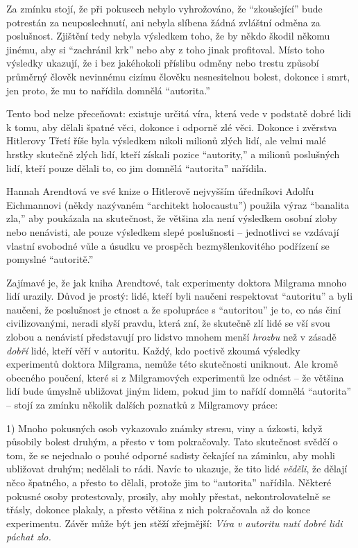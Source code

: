 \documentclass{book}
\begin{document}
Za zmínku stojí, že při pokusech nebylo vyhrožováno, že \enquote{zkoušející} bude potrestán za neuposlechnutí, ani nebyla slíbena žádná zvláštní odměna za poslušnost. Zjištění tedy nebyla výsledkem toho, že by někdo škodil někomu jinému, aby si \enquote{zachránil krk} nebo aby z toho jinak profitoval. Místo toho výsledky ukazují, že i bez jakéhokoli příslibu odměny nebo trestu způsobí průměrný člověk nevinnému cizímu člověku nesnesitelnou bolest, dokonce i smrt, jen proto, že mu to nařídila domnělá \enquote{autorita.}

Tento bod nelze přeceňovat: existuje určitá víra, která vede v podstatě dobré lidi k tomu, aby dělali špatné věci, dokonce i odporně zlé věci. Dokonce i zvěrstva Hitlerovy Třetí říše byla výsledkem nikoli milionů zlých lidí, ale velmi malé hrstky skutečně zlých lidí, kteří získali pozice \enquote{autority,} a milionů poslušných lidí, kteří pouze dělali to, co jim domnělá \enquote{autorita} nařídila.

Hannah Arendtová ve své knize o Hitlerově nejvyšším úředníkovi Adolfu Eichmannovi (někdy nazývaném \enquote{architekt holocaustu}) použila výraz \enquote{banalita zla,} aby poukázala na skutečnost, že většina zla není výsledkem osobní zloby nebo nenávisti, ale pouze výsledkem slepé poslušnosti -- jednotlivci se vzdávají vlastní svobodné vůle a úsudku ve prospěch bezmyšlenkovitého podřízení se pomyslné \enquote{autoritě.}

Zajímavé je, že jak kniha Arendtové, tak experimenty doktora Milgrama mnoho lidí urazily. Důvod je prostý: lidé, kteří byli naučeni respektovat \enquote{autoritu} a byli naučeni, že poslušnost je ctnost a že spolupráce s \enquote{autoritou} je to, co nás činí civilizovanými, neradi slyší pravdu, která zní, že skutečně zlí lidé se vší svou zlobou a nenávistí představují pro lidstvo mnohem menší \emph{hrozbu} než v zásadě \emph{dobří} lidé, kteří věří v autoritu. Každý, kdo poctivě zkoumá výsledky experimentů doktora Milgrama, nemůže této skutečnosti uniknout. Ale kromě obecného poučení, které si z Milgramových experimentů lze odnést -- že většina lidí bude úmyslně ubližovat jiným lidem, pokud jim to nařídí domnělá \enquote{autorita} -- stojí za zmínku několik dalších poznatků z Milgramovy práce:

1) Mnoho pokusných osob vykazovalo známky stresu, viny a úzkosti, když působily bolest druhým, a přesto v tom pokračovaly. Tato skutečnost svědčí o tom, že se nejednalo o pouhé odporné sadisty čekající na záminku, aby mohli ubližovat druhým; nedělali to rádi. Navíc to ukazuje, že tito lidé \emph{věděli}, že dělají něco špatného, a přesto to dělali, protože jim to \enquote{autorita} nařídila. Některé pokusné osoby protestovaly, prosily, aby mohly přestat, nekontrolovatelně se třásly, dokonce plakaly, a přesto většina z nich pokračovala až do konce experimentu. Závěr může být jen stěží zřejmější: \emph{Víra v autoritu nutí dobré lidi páchat zlo.}
\end{document}
